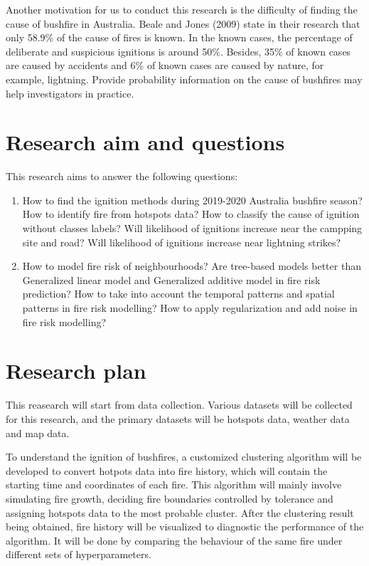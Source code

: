 \documentclass{monashthesis}
\begin{document}
Another motivation for us to conduct this research is the difficulty of
finding the cause of bushfire in Australia. Beale and Jones (2009) state
in their research that only 58.9\% of the cause of fires is known. In
the known cases, the percentage of deliberate and suspicious ignitions
is around 50\%. Besides, 35\% of known cases are caused by accidents and
6\% of known cases are caused by nature, for example, lightning. Provide
probability information on the cause of bushfires may help investigators
in practice.

\section{Research aim and questions}\label{research-aim-and-questions}

This research aims to answer the following questions:

\begin{enumerate}
\def\labelenumi{\arabic{enumi}.}
\tightlist
\item
  How to find the ignition methods during 2019-2020 Australia bushfire
  season? How to identify fire from hotspots data? How to classify the
  cause of ignition without classes labels? Will likelihood of ignitions
  increase near the campping site and road? Will likelihood of ignitions
  increase near lightning strikes?
\item
  How to model fire risk of neighbourhoods? Are tree-based models better
  than Generalized linear model and Generalized additive model in fire
  risk prediction? How to take into account the temporal patterns and
  spatial patterns in fire risk modelling? How to apply regularization
  and add noise in fire risk modelling?
\end{enumerate}

\section{Research plan}\label{research-plan}

This reasearch will start from data collection. Various datasets will be
collected for this research, and the primary datasets will be hotspots
data, weather data and map data.

To understand the ignition of bushfires, a customized clustering
algorithm will be developed to convert hotpots data into fire history,
which will contain the starting time and coordinates of each fire. This
algorithm will mainly involve simulating fire growth, deciding fire
boundaries controlled by tolerance and assigning hotspots data to the
most probable cluster. After the clustering result being obtained, fire
history will be visualized to diagnostic the performance of the
algorithm. It will be done by comparing the behaviour of the same fire
under different sets of hyperparameters.
\end{document}
